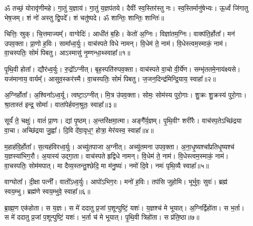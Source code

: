 \setcounter{anuvakam}{0}
ॐ तच्छं॒ योरावृ॑णीमहे। 
गा॒तुं य॒ज्ञाय॑। 
गा॒तुं य॒ज्ञप॑तये। 
दैवीः᳚ स्व॒स्तिर॑स्तु नः। 
स्व॒स्तिर्मानु॑षेभ्यः। 
ऊ॒र्ध्वं जि॑गातु भेष॒जम्। 
शं नो॑ अस्तु द्वि॒पदे᳚। 
शं चतु॑ष्पदे। 
ॐ शान्तिः॒ शान्तिः॒ शान्तिः॑॥

चित्तिः॒ स्रुक्। 
चि॒त्तमाज्यम्᳚। 
वाग्वेदिः॑। 
आधी॑तं ब॒\ar{}हिः। 
केतो॑ अ॒ग्निः। 
विज्ञा॑तम॒ग्निः। 
वाक्प॑ति॒र्\mbox{}होता᳚। 
मन॑ उपव॒क्ता। 
प्रा॒णो ह॒विः। 
सामा᳚ध्व॒र्युः। 
वाच॑स्पते विधे नामन्। 
वि॒धेम॑ ते॒ नाम॑। 
वि॒धेस्त्वम॒स्माकं॒ नाम॑। 
वा॒चस्पतिः॒ सोमं॑ पिबतु। 
आऽस्मासु॑ नृ॒म्णन्धा॒थ्स्वाहा᳚॥१॥
\anuvakamend[अ॒ध्व॒र्युः पञ्च॑ च]

पृ॒थि॒वी होता᳚। 
द्यौर॑ध्व॒र्युः। 
रु॒द्रो᳚ऽग्नीत्। 
बृह॒स्पति॑रुपव॒क्ता। 
वाच॑स्पते वा॒चो वी॒र्ये॑ण। 
सम्भृ॑ततमे॒नाय॑क्ष्यसे। 
यज॑मानाय॒ वार्यम्᳚। 
आसुव॒स्कर॑स्मै। 
वा॒चस्पतिः॒ सोमं॑ पिबतु। 
ज॒जन॒दिन्द्र॑\-मिन्द्रि॒याय॒ स्वाहा᳚॥२॥%
\anuvakamend[पृ॒थि॒वी होता॒ दश॑]

अ॒ग्निर्\mbox{}होता᳚। 
अ॒श्विना᳚ऽध्व॒र्यू। 
त्वष्टा॒ऽग्नीत्। 
मि॒त्र उ॑पव॒क्ता। 
सोमः॒ सोम॑स्य पुरो॒गाः। 
शु॒क्रः  शु॒क्रस्य॑ पुरो॒गाः। 
श्रा॒तास्त॑ इन्द्र॒ सोमाः᳚। 
वाता॑पेर्\mbox{}हवन॒श्रुतः॒ स्वाहा᳚॥३॥%
\anuvakamend[अ॒ग्निर्होता॒ऽष्टौ]

सूर्यं॑ ते॒ चक्षुः॑। 
वातं॑ प्रा॒णः। 
द्यां पृ॒ष्ठम्। 
अ॒न्तरि॑क्षमा॒त्मा। 
अङ्गै᳚र्\mbox{}य॒ज्ञम्। 
पृ॒थि॒वीꣳ शरी॑रैः। 
वाच॑स्प॒तेऽच्छि॑द्रया वा॒चा। 
अच्छि॑द्रया जु॒ह्वा᳚। 
दि॒वि दे॑वा॒वृध॒ꣳ॒ होत्रा॒ मेर॑यस्व॒ स्वाहा᳚॥४॥%
\anuvakamend[सूर्यं॑ ते॒ नव॑]

म॒हाह॑वि॒र्\mbox{}होता᳚। 
स॒त्यह॑विरध्व॒र्युः। 
अच्यु॑तपाजा अ॒ग्नीत्। 
अच्यु॑तमना उपव॒क्ता। 
अ॒ना॒धृ॒ष्यश्चा᳚प्रतिधृ॒ष्यश्च॑ य॒ज्ञस्या॑भिग॒रौ। 
अ॒यास्य॑ उद्गा॒ता। 
वाच॑स्पते हृद्विधे नामन्। 
वि॒धेम॑ ते॒ नाम॑। 
वि॒धेस्त्वम॒स्माकं॒ नाम॑। 
वा॒चस्पतिः॒ सोम॑मपात्। 
मा दैव्य॒स्तन्तु॒श्छेदि॒ मा म॑नु॒ष्यः॑। 
नमो॑ दि॒वे। 
नमः॑ पृथि॒व्यै स्वाहा᳚॥५॥%
\anuvakamend[अ॒पा॒त्त्रीणि॑ च]

वाग्घोता᳚। 
दी॒क्षा पत्नी᳚। 
वातो᳚ऽध्व॒र्युः। 
आपो॑ऽभिग॒रः। 
मनो॑ ह॒विः। 
तप॑सि जुहोमि। 
भूर्भुवः॒ सुवः॑। 
ब्रह्म॑ स्वय॒म्भु। 
ब्रह्म॑णे स्वय॒म्भुवे॒ स्वाहा᳚॥६॥
\anuvakamend[वाग्घोता॒ नव॑]

ब्रा॒ह्म॒ण एक॑होता। 
स य॒ज्ञः। 
स मे॑ ददातु प्र॒जां प॒शून्पुष्टिं॒ यशः॑। 
य॒ज्ञश्च॑ मे भूयात्। 
अ॒ग्निर्द्विहो॑ता। 
स भ॒र्ता। 
स मे॑ ददातु प्र॒जां प॒शून्पुष्टिं॒ यशः॑। 
भ॒र्ता च॑ मे भूयात्। 
पृ॒थि॒वी त्रिहो॑ता। 
स प्र॑ति॒ष्ठा॥७॥

